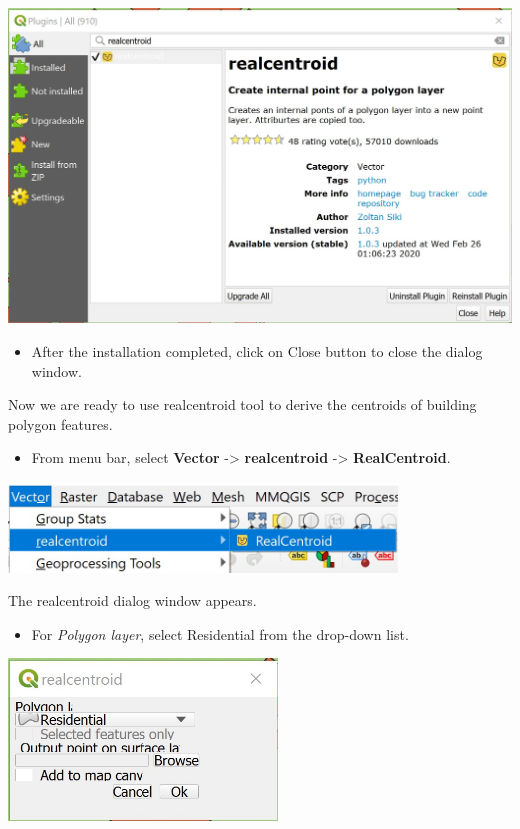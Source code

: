 \documentclass[
  letterpaper,
  DIV=11,
  numbers=noendperiod]{scrreprt}
\providecommand{\tightlist}{%
  \setlength{\itemsep}{0pt}\setlength{\parskip}{0pt}}\usepackage{longtable,booktabs,array}
\begin{document}
\includegraphics{./img04/image111.jpg}

\begin{itemize}
\tightlist
\item
  After the installation completed, click on Close button to close the
  dialog window.
\end{itemize}

Now we are ready to use realcentroid tool to derive the centroids of
building polygon features.

\begin{itemize}
\tightlist
\item
  From menu bar, select \textbf{Vector} -\textgreater{}
  \textbf{realcentroid} -\textgreater{} \textbf{RealCentroid}.
\end{itemize}

\includegraphics[width=4.0625in,height=\textheight]{./img04/image112.jpg}

The realcentroid dialog window appears.

\begin{itemize}
\tightlist
\item
  For \emph{Polygon layer}, select Residential from the drop-down list.
\end{itemize}

\includegraphics[width=2.8125in,height=\textheight]{./img04/image113.jpg}
\end{document}
